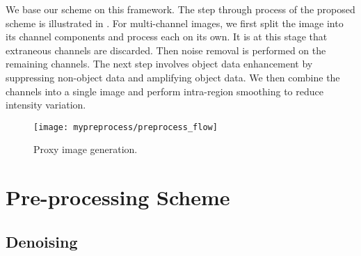 We base our scheme on this framework. The step through process of the proposed scheme is illustrated in . For multi-channel images, we first split the image into its channel components and process each on its own. It is at this stage that extraneous channels are discarded. Then noise removal is performed on the remaining channels. The next step involves object data enhancement by suppressing non-object data and amplifying object data. We then combine the channels into a single image and perform intra-region smoothing to reduce intensity variation.

\begin{figure}[!h]
	\centering
	\texttt{[image: mypreprocess/preprocess\_flow]}
	\caption{Proxy image generation.}
	\label{fig:flowchartproposedscheme}
\end{figure}


\section{Pre-processing Scheme}
\label{sec:preprocessscheme}



\subsection{Denoising}
\label{sec:PoissonDenoising}

